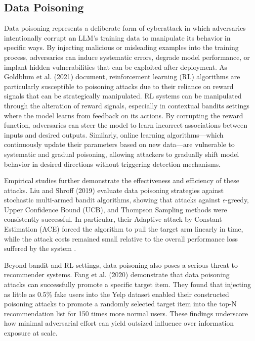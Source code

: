 \documentclass[conference=acm]{confpaper}
\begin{document}
\subsection{Data Poisoning}
Data poisoning represents a deliberate form of cyberattack in which adversaries intentionally corrupt an LLM's training data to manipulate its behavior in specific ways. By injecting malicious or misleading examples into the training process, adversaries can induce systematic errors, degrade model performance, or implant hidden vulnerabilities that can be exploited after deployment. As Goldblum et al. (2021) document, reinforcement learning (RL) algorithms are particularly susceptible to poisoning attacks due to their reliance on reward signals that can be strategically manipulated. RL systems can be manipulated through the alteration of reward signals, especially in contextual bandits settings where the model learns from feedback on its actions. By corrupting the reward function, adversaries can steer the model to learn incorrect associations between inputs and desired outputs. Similarly, online learning algorithms—which continuously update their parameters based on new data—are vulnerable to systematic and gradual poisoning, allowing attackers to gradually shift model behavior in desired directions without triggering detection mechanisms. \cite{Goldblum}

Empirical studies further demonstrate the effectiveness and efficiency of these attacks. Liu and Shroff (2019) evaluate data poisoning strategies against stochastic multi-armed bandit algorithms, showing that attacks against $\epsilon$-greedy, Upper Confidence Bound (UCB), and Thompson Sampling methods were consistently successful. In particular, their Adaptive attack by Constant Estimation (ACE) forced the algorithm to pull the target arm linearly in time, while the attack costs remained small relative to the overall performance loss suffered by the system \cite{Liu}.

Beyond bandit and RL settings, data poisoning also poses a serious threat to recommender systems. Fang et al. (2020) demonstrate that data poisoning attacks can successfully promote a specific target item. They found that injecting as little as 0.5\% fake users into the Yelp dataset enabled their constructed poisoning attacks to promote a randomly selected target item into the top-N recommendation list for 150 times more normal users. \cite{Fang} These findings underscore how minimal adversarial effort can yield outsized influence over information exposure at scale.
\end{document}
